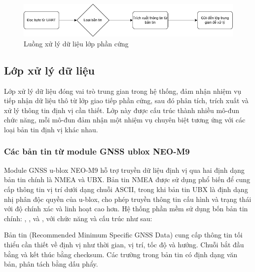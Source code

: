 \documentclass[../DoAn.tex]{subfiles}
\begin{document}
\begin{figure}[H]
    \includegraphics[width=\linewidth]{Hinhve/HardwareFlow.png}
    \caption{Luồng xử lý dữ liệu lớp phần cứng}
    \label{fig:label}
\end{figure}

\subsection{Lớp xử lý dữ liệu}
\label{subsection:4.2.3}
Lớp xử lý dữ liệu đóng vai trò trung gian trong hệ thống, đảm nhận nhiệm vụ tiếp nhận dữ liệu thô từ lớp giao tiếp phần cứng, sau đó phân tích, trích xuất và xử lý thông tin định vị cần thiết. Lớp này được cấu trúc thành nhiều mô-đun chức năng, mỗi mô-đun đảm nhận một nhiệm vụ chuyên biệt tương ứng với các loại bản tin định vị khác nhau.
\subsubsection{Các bản tin từ module GNSS ublox NEO-M9}
\label{subsubsection:4.2.3.1}
Module GNSS u-blox NEO-M9 hỗ trợ truyền dữ liệu định vị qua hai định dạng bản tin chính là NMEA và UBX. Bản tin NMEA được sử dụng phổ biến để cung cấp thông tin vị trí dưới dạng chuỗi ASCII, trong khi bản tin UBX là định dạng nhị phân độc quyền của u-blox, cho phép truyền thông tin cấu hình và trạng thái với độ chính xác và linh hoạt cao hơn. Hệ thống phần mềm sử dụng bốn bản tin chính: , ,  và , với chức năng và cấu trúc như sau:

Bản tin  (Recommended Minimum Specific GNSS Data) cung cấp thông tin tối thiểu cần thiết về định vị như thời gian, vị trí, tốc độ và hướng. Chuỗi bắt đầu bằng  và kết thúc bằng checksum. Các trường trong bản tin có định dạng văn bản, phân tách bằng dấu phẩy.
\end{document}
